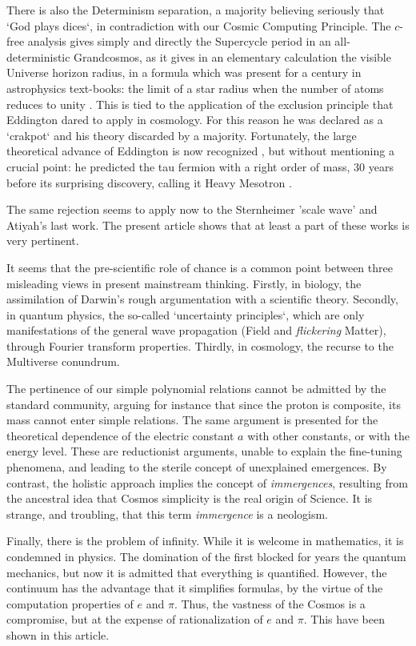 \documentclass[twoside,draft]{article}
\begin{document}
\begin{sloppypar}
There is also the Determinism separation, a majority believing seriously that `God plays dices`,
in contradiction with our Cosmic Computing Principle. The $c$-free analysis gives simply and
directly the Supercycle period in an all-deterministic Grandcosmos, as it gives in an elementary
calculation the visible Universe horizon radius, in a formula which was present for a century in
astrophysics text-books: the limit of a star radius when the number of atoms reduces to unity \cite{Sanchez1}.
This is tied to the application of the exclusion principle that Eddington dared to apply in
cosmology. For this reason he was declared as a `crakpot` and his theory discarded by a majority.
Fortunately, the large theoretical advance of Eddington is now recognized \cite{Larin,Durham}, but without
mentioning a crucial point: he predicted the tau fermion with a right order of mass, 30 years before its surprising discovery, calling it Heavy Mesotron \cite{Eddington}.

The same rejection seems to apply now to the Sternheimer 'scale wave' and Atiyah's last work. The present article shows that at least a part of these works is very pertinent.

It seems that the pre-scientific role of chance is a common point between three misleading views
in present mainstream thinking. Firstly, in biology, the assimilation of Darwin's rough argumentation
with a scientific theory. Secondly, in quantum physics, the so-called `uncertainty principles`, which are
only manifestations of the general wave propagation (Field and \textit{flickering} Matter), through Fourier
transform properties. Thirdly, in cosmology, the recurse to the Multiverse conundrum.

The pertinence of our simple polynomial relations cannot be admitted by the standard community, arguing for instance that since the proton is composite, its mass cannot enter simple relations. The same argument is presented for the theoretical dependence of the electric constant $a$ with other constants, or with the energy level. These are reductionist arguments, unable to explain the fine-tuning phenomena, and leading to the sterile concept of unexplained emergences. By contrast, the holistic approach implies the concept of \textit{immergences}, resulting from the ancestral idea that Cosmos simplicity is the real origin of Science. It is strange, and troubling, that this term \textit{immergence} is a neologism.

Finally, there is the problem of infinity. While it is welcome in mathematics, it is condemned in physics. The domination of the first blocked for years the quantum mechanics, but now it is admitted that everything is quantified. However, the continuum has the advantage that it simplifies formulas, by the virtue of the computation properties of $e$ and $\pi$. Thus, the vastness of the Cosmos is a compromise, but at the expense of rationalization of $e$ and $\pi$. This have been shown in this article.


\end{sloppypar}
\end{document}
